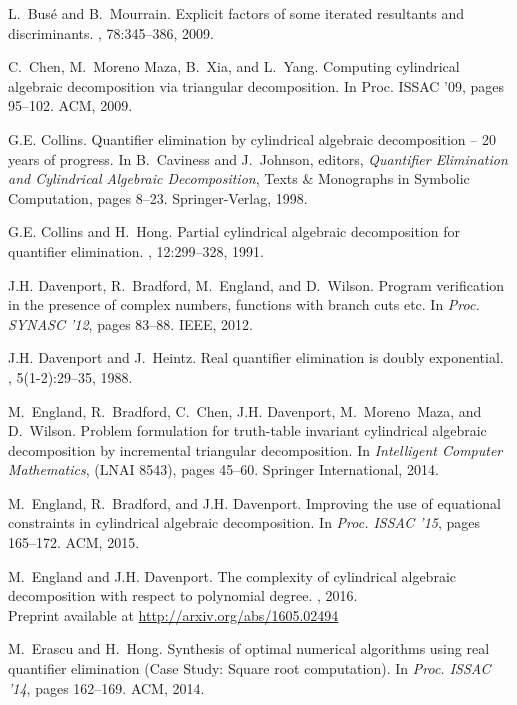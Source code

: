 \documentclass{llncs}
\begin{document}
\begin{thebibliography}{10}
L.~Bus\'{e} and B.~Mourrain.
\newblock Explicit factors of some iterated resultants and discriminants.
, 78:345--386, 2009.

C.~Chen, M.~{Moreno Maza}, B.~Xia, and L.~Yang.
\newblock Computing cylindrical algebraic decomposition via triangular
  decomposition.
\newblock In {Proc. ISSAC '09}, pages 95--102. ACM,
  2009.

G.E. Collins.
\newblock Quantifier elimination by cylindrical algebraic decomposition -- 20
  years of progress.
\newblock In B.~Caviness and J.~Johnson, editors, {\em Quantifier Elimination
  and Cylindrical Algebraic Decomposition}, Texts \& Monographs in Symbolic
  Computation, pages 8--23. Springer-Verlag, 1998.

G.E. Collins and H.~Hong.
\newblock Partial cylindrical algebraic decomposition for quantifier
  elimination.
, 12:299--328, 1991.

J.H. Davenport, R.~Bradford, M.~England, and D.~Wilson.
\newblock Program verification in the presence of complex numbers, functions
  with branch cuts etc.
\newblock In {\em Proc. SYNASC '12}, pages 83--88. IEEE, 2012.

J.H. Davenport and J.~Heintz.
\newblock Real quantifier elimination is doubly exponential.
, 5(1-2):29--35, 1988.

M.~England, R.~Bradford, C.~Chen, J.H. Davenport, M.~{Moreno~Maza}, and
  D.~Wilson.
\newblock Problem formulation for truth-table invariant cylindrical algebraic
  decomposition by incremental triangular decomposition.
\newblock In {\em Intelligent Computer Mathematics}, (LNAI 8543), pages 45--60. Springer International, 2014.

M.~England, R.~Bradford, and J.H. Davenport.
\newblock Improving the use of equational constraints in cylindrical algebraic
  decomposition.
\newblock In {\em Proc. ISSAC '15}, pages 165--172. ACM, 2015.

M.~England and J.H. Davenport.
\newblock The complexity of cylindrical algebraic decomposition with respect to
  polynomial degree.
, 2016.  \\
Preprint available at \url{http://arxiv.org/abs/1605.02494}

M.~Erascu and H.~Hong.
\newblock Synthesis of optimal numerical algorithms using real quantifier
  elimination ({C}ase {S}tudy: {S}quare root computation).
\newblock In {\em Proc. ISSAC '14}, pages 162--169. ACM,
  2014.


\end{thebibliography}
\end{document}
